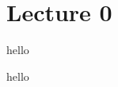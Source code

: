 \section{Lecture 0}
\begin{definition}
hello
\end{definition}


\begin{question}
hello
\end{question}
